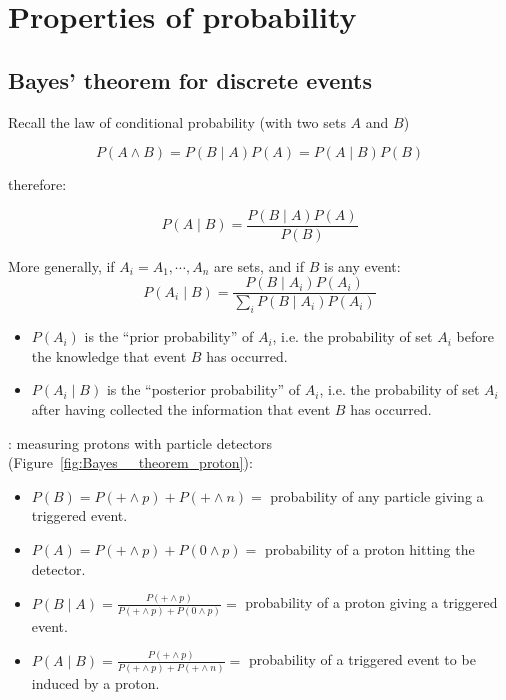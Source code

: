 

\section{Properties of probability}
\label{sec:prop_of_prob}

\subsection{Bayes' theorem for discrete events}
\label{subsec:bayes__discrete}

Recall the law of conditional probability (with two sets $A$ and $B$)

\begin{equation}
	P(A \wedge B) = P(B \mid A) P(A) = P(A \mid B) P(B)
\end{equation}

therefore:

\begin{equation}\label{eq:bayes__discrete}
	P(A \mid B) = \frac{P(B \mid A) P(A)}{P(B)}
\end{equation}

More generally, if $A_{i} = A_{1}, \cdots, A_{n}$ are  sets, and if $B$ is any event:
\begin{equation}\label{eq:bayes__discrete_general}
	P(A_{i} \mid B)
	= \frac{P(B \mid A_{i}) P(A_{i})}
		{\sum_{i}{P(B \mid A_{i}) P(A_{i})}}
\end{equation}

\begin{itemize}
	\item $P(A_{i})$ is the “prior probability” of $A_{i}$, i.e. the probability of set $A_{i}$ before the knowledge that event $B$ has occurred.
	\item $P(A_{i} \mid B)$ is the “posterior probability” of $A_{i}$, i.e. the probability of set $A_{i}$ after having collected the information that event $B$ has occurred.
\end{itemize}

: measuring protons with particle detectors (Figure~\ref{fig:Bayes__theorem_proton}):

\begin{itemize}
	\item $P(B) = P(+ \wedge p) + P(+ \wedge n) = $ probability of any particle giving a triggered event.
	\item $P(A) = P(+ \wedge p) + P(0 \wedge p) = $ probability of a proton hitting the detector.
	\item $P(B \mid A) = \frac{P(+ \wedge p)}{P(+ \wedge p) + P(0 \wedge p)} = $ probability of a proton giving a triggered event.
	\item $P(A \mid B) = \frac{P(+ \wedge p)}{P(+ \wedge p) + P(+ \wedge n)} = $ probability of a triggered event to be induced by a proton.
\end{itemize}

